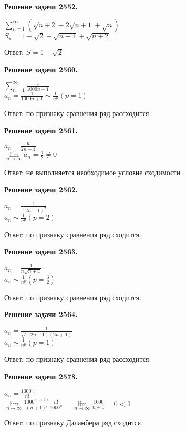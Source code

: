 \documentclass[a4paper,12pt]{article}
\newenvironment{problem}[1]{\par\bigskip\noindent\textbf{Решение задачи #1.}
  \enskip\ignorespaces}{}
\begin{document}
  \begin{problem}{2552}

    $\sum\limits_{n=1}^{\infty} (\sqrt{n+2} - 2\sqrt{n+1} + \sqrt{n})$ \\
    $S_n = 1 - \sqrt{2} - \sqrt{n+1} + \sqrt{n+2}$

    Ответ: $S = 1 - \sqrt{2}$
  \end{problem}
  
  \begin{problem}{2560}

    $\sum\limits_{n = 1}^{\infty} \frac{1}{1000n+1}$ \\
    $a_n = \frac{1}{1000n+1} \sim \frac{1}{n^p}(p = 1)$

    Ответ: по признаку сравнения ряд рассходится.

  \end{problem}

  \begin{problem}{2561}

    $a_n = \frac{n}{2n - 1}$ \\
    $\lim\limits_{n \to \infty} a_n = \frac{1}{2} \not = 0$

    Ответ: не выполняется необходимое условие сходимости.
  \end{problem}

  \begin{problem}{2562}

    $a_n = \frac{1}{(2n - 1)^2}$ \\
    $a_n \sim \frac{1}{n^p} (p = 2)$

    Ответ: по признаку сравнения ряд сходится.
  \end{problem}

  \begin{problem}{2563}

    $a_n = \frac{1}{n\sqrt{n+1}}$ \\
    $a_n \sim \frac{1}{n^p} (p = \frac{3}{2})$

    Ответ: по признаку сравнения ряд сходится.
  \end{problem}

  \begin{problem}{2564}

    $a_n = \frac{1}{\sqrt{(2n - 1)(2n + 1)}}$ \\
    $a_n \sim \frac{1}{n^p} (p = 1)$

    Ответ: по признаку сравнения ряд рассходится.
  \end{problem}

  \begin{problem}{2578}

    $a_n = \frac{1000^n}{n!}$ \\
    $\lim\limits_{n \to \infty} \frac{1000^{(n+1)}}{(n+1)!} \frac{n!}{1000^n}
    = \lim\limits_{n \to \infty} \frac{1000}{n + 1} = 0 < 1$

    Ответ: по признаку Даламбера ряд сходится.
  \end{problem}
\end{document}
